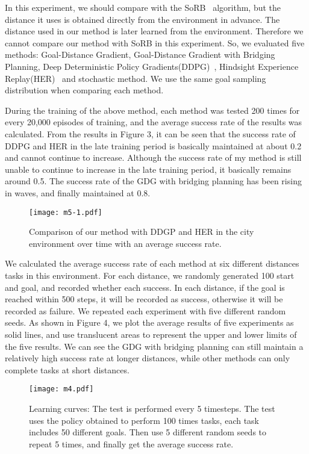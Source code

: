 \documentclass[8pt,twoside,a4paper]{article}
\begin{document}
\par In this experiment, we should compare with the SoRB~\cite{eysenbach2019search} algorithm, but the distance it uses is obtained directly from the environment in advance. The distance used in our method is later learned from the environment. Therefore we cannot compare our method with SoRB in this experiment. So, we evaluated five methods: Goal-Distance Gradient, Goal-Distance Gradient with Bridging Planning, Deep Deterministic Policy Gradients(DDPG)~\cite{lillicrap2016continuous}, Hindsight Experience Replay(HER)~\cite{andrychowicz2017hindsight} and stochastic method. We use the same goal sampling distribution when comparing each method.

\par During the training of the above method, each method was tested 200 times for every 20,000 episodes of training, and the average success rate of the results was calculated. From the results in Figure 3, it can be seen that the success rate of DDPG and HER in the late training period is basically maintained at about 0.2 and cannot continue to increase. Although the success rate of my method is still unable to continue to increase in the late training period, it basically remains around 0.5. The success rate of the GDG with bridging planning has been rising in waves, and finally maintained at 0.8.
\begin{figure}[h]
\centering
\texttt{[image: m5-1.pdf]}
\label{3}
\caption{Comparison of our method with DDGP and HER in the city environment over time with an average success rate.}
\end{figure}

\par We calculated the average success rate of each method at six different distances tasks in this environment. For each distance, we randomly generated 100 start and goal, and recorded whether each success. In each distance, if the goal is reached within 500 steps, it will be recorded as success, otherwise it will be recorded as failure. We repeated each experiment with five different random seeds. As shown in Figure 4, we plot the average results of five experiments as solid lines, and use translucent areas to represent the upper and lower limits of the five results. We can see the GDG with bridging planning can still maintain a relatively high success rate at longer distances, while other methods can only complete tasks at short distances.
\begin{figure}[h]
\centering
\texttt{[image: m4.pdf]}
\label{4}
\caption{Learning curves: The test is performed every 5 timesteps. The test uses the policy obtained to perform 100 times tasks, each task includes 50 different goals. Then use 5 different random seeds to repeat 5 times, and finally get the average success rate.}
\end{figure}
\end{document}
